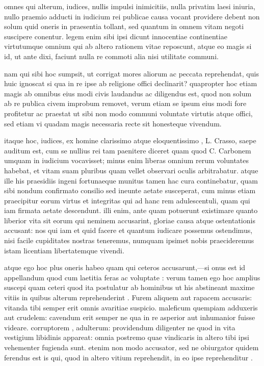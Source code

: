 
 omnes qui alterum, iudices, nullis impulsi inimicitiis, nulla privatim laesi iniuria, nullo praemio adducti in iudicium rei publicae causa vocant providere debent non solum quid oneris in praesentia tollant, sed quantum in omnem vitam negoti suscipere conentur. legem enim sibi ipsi dicunt innocentiae continentiae virtutumque omnium qui ab altero rationem vitae reposcunt, atque eo magis si id, ut ante dixi, faciunt nulla re commoti alia nisi utilitate communi.

 nam qui sibi hoc sumpsit, ut corrigat mores aliorum ac peccata reprehendat, quis huic ignoscat si qua in re ipse ab religione offici declinarit? quapropter hoc etiam magis ab omnibus eius modi civis laudandus ac diligendus est, quod non solum ab re publica civem improbum removet, verum etiam se ipsum eius modi fore profitetur ac praestat ut sibi non modo communi voluntate virtutis atque offici, sed etiam vi quadam magis necessaria recte sit honesteque vivendum.

 itaque hoc, iudices, ex homine clarissimo atque eloquentissimo , L. Crasso, saepe auditum est, cum se nullius rei tam paenitere diceret quam quod C. Carbonem umquam in iudicium vocavisset; minus enim liberas omnium rerum voluntates habebat, et vitam suam pluribus quam vellet observari oculis arbitrabatur. atque ille his praesidiis ingeni fortunaeque munitus tamen hac cura continebatur, quam sibi nondum confirmato consilio sed ineunte aetate susceperat, cum minus etiam praecipitur eorum virtus et integritas qui ad hanc rem adulescentuli, quam qui iam firmata aetate descendunt. illi enim, ante quam potuerunt existimare quanto liberior vita sit eorum qui neminem accusarint, gloriae causa atque ostentationis accusant: nos qui iam et quid facere et quantum iudicare possemus ostendimus, nisi facile cupiditates nostras teneremus, numquam ipsimet nobis praecideremus istam licentiam libertatemque vivendi.

 atque ego hoc plus oneris habeo quam qui ceteros accusarunt,—si onus est id appellandum quod cum laetitia feras ac voluptate : verum tamen ego hoc amplius suscepi quam ceteri quod ita postulatur ab hominibus ut his abstineant maxime vitiis in quibus alterum reprehenderint . Furem aliquem aut rapacem accusaris: vitanda tibi semper erit omnis avaritiae suspicio. maleficum quempiam adduxeris aut crudelem: cavendum erit semper ne qua in re asperior aut inhumanior fuisse videare. corruptorem , adulterum: providendum diligenter ne quod in vita vestigium libidinis appareat: omnia postremo quae vindicaris in altero tibi ipsi vehementer fugienda sunt. etenim non modo accusator, sed ne obiurgator quidem ferendus est is qui, quod in altero vitium reprehendit, in eo ipse reprehenditur .

